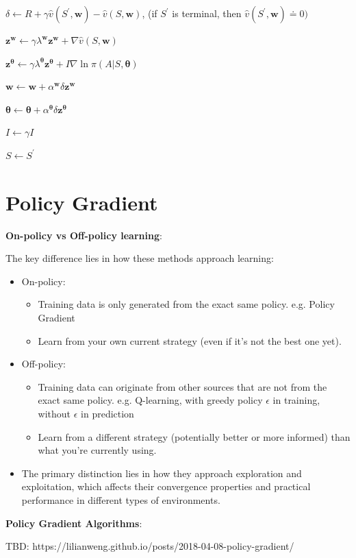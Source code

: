 \documentclass{article}
\begin{document}
\hspace{1cm} $\delta \gets R + \gamma \hat { v } ( S ^ { \prime } \mathbf { , } \mathbf { w } ) - \hat { v } ( S \mathbf { , } \mathbf { w } )$, (if $S ^ { \prime }$ is terminal, then $\hat { v } ( S ^ { \prime } ,   \mathbf { w } ) \doteq 0 )$

\hspace{1cm} $\mathbf { z ^ { w } } \gets \gamma \lambda ^ { \mathbf { w } } \mathbf { z ^ { w } } + \nabla \hat { v } ( S \mathbf { , } \mathbf { w } )$

\hspace{1cm} $\mathbf { z } ^ { \pmb { \theta } } \leftarrow \gamma \lambda ^ { \pmb { \theta } } \mathbf { z } ^ { \pmb { \theta } } + I \nabla \ln \pi ( A | S , \pmb { \theta } )$

\hspace{1cm} $\mathbf { w } \leftarrow \mathbf { w } + \alpha ^ { \mathbf { w } }   \delta \mathbf { z } ^ { \mathbf { w } }$

\hspace{1cm} $\pmb { \theta } \leftarrow \pmb { \theta } + \alpha ^ { \pmb { \theta } } \delta \mathbf { z } ^ { \pmb { \theta } }$

\hspace{1cm} $I \leftarrow \gamma I$

\hspace{1cm} $S \leftarrow S ^ { \prime }$

\section{Policy Gradient}

\textbf{On-policy vs Off-policy learning}:

The key difference lies in how these methods approach learning:

\begin{itemize}
    \item On-policy:
    \begin{itemize}
        \item Training data is only generated from the exact same policy. e.g. Policy Gradient
        \item Learn from your own current strategy (even if it's not the best one yet).
    \end{itemize}
    \item Off-policy:
    \begin{itemize}
        \item Training data can originate from other sources that are not from the exact same policy. e.g. Q-learning, with greedy policy \(\epsilon\) in training, without \(\epsilon\) in prediction
        \item Learn from a different strategy (potentially better or more informed) than what you're currently using.
    \end{itemize}
    \item The primary distinction lies in how they approach exploration and exploitation, which affects their convergence properties and practical performance in different types of environments.
\end{itemize}

\textbf{Policy Gradient Algorithms}:

TBD: https://lilianweng.github.io/posts/2018-04-08-policy-gradient/

\printindex
\end{document}
